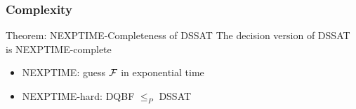 \begin{frame}
  \frametitle{Complexity}
  \begin{block}{Theorem: NEXPTIME-Completeness of DSSAT}
    The decision version of DSSAT is NEXPTIME-complete
    \begin{itemize}
      \item NEXPTIME: guess $\mathcal{F}$ in exponential time
      \item NEXPTIME-hard: DQBF $\leq_P$ DSSAT
    \end{itemize}
  \end{block}
\end{frame}